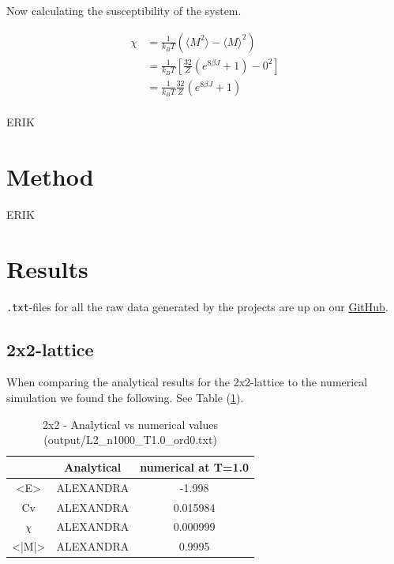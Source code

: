 \documentclass{article}
\begin{document}
Now calculating the susceptibility of the system.

\begin{align*}
    \chi &= \frac{1}{k_B T} \left( \langle M^2 \rangle - \langle M \rangle ^2 \right) \\
    &= \frac{1}{k_B T} \left[ \frac{32}{Z} \left( e^{8 \beta J} + 1 \right) - 0^2 \right] \\
    &= \frac{1}{k_B T} \frac{32}{Z} \left( e^{8 \beta J} + 1 \right) \\
\end{align*}



ERIK



\vspace{1cm}

\section{Method} \label{sec:Method}

ERIK

\vspace{1cm}

\section{Results} \label{sec:Results}

  \texttt{.txt}-files for all the raw data generated by the projects are up on our \href{https://github.com/Erikbgram/Fys3150}{GitHub}. \\

\subsection{2x2-lattice}

When comparing the analytical results for the 2x2-lattice to the numerical simulation we found the following. See Table (\ref{tab:analytical}).

  \begin{table}[ht]
    \centering
    \caption{2x2 - Analytical vs numerical values (output/L2\_n1000\_T1.0\_ord0.txt)}
    \vspace{2mm}
    \label{tab:analytical}
    \begin{tabular}{|c|c|c|}
        \hline
         & Analytical & numerical at T=1.0\\
        \hline \hline
        <E> & ALEXANDRA & -1.998 \\
        Cv & ALEXANDRA & 0.015984 \\
        $\chi$ & ALEXANDRA & 0.000999 \\
        <|M|> & ALEXANDRA & 0.9995 \\
        \hline
    \end{tabular} \\
    \hspace{0pt}\\
  \end{table}
\end{document}
